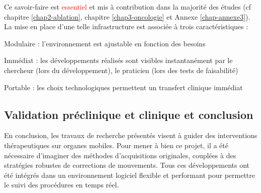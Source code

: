 Ce savoir-faire est \textcolor{red}{essentiel} et mis à contribution dans la majorité des études (cf chapitre \ref{chap2-ablation}, chapitre \ref{chap3-oncologie} et Annexe \ref{chap-annexe3}). La mise en place d’une telle infrastructure est associée à trois caractéristiques :
\begin{description}
\item Modulaire : l’environnement est ajustable en fonction des besoins
\item Immédiat : les développements réalisés sont visibles instantanément par le chercheur (lors du développement), le praticien (lors des tests de faisabilité)
\item Portable : les choix technologiques permettent un transfert clinique immédiat
\end{description}

\subsection{Validation préclinique et clinique et conclusion}
\label{chap4-conclusion}

En conclusion, les travaux de recherche présentés visent à guider des interventions thérapeutiques sur organes mobiles. Pour mener à bien ce projet, il a été nécessaire d’imaginer des méthodes d’acquisitions originales, couplées à des stratégies robustes de corrections de mouvements. Tous ces développements ont été intégrés dans un environnement logiciel flexible et performant pour permettre le suivi des procédures en temps réel.